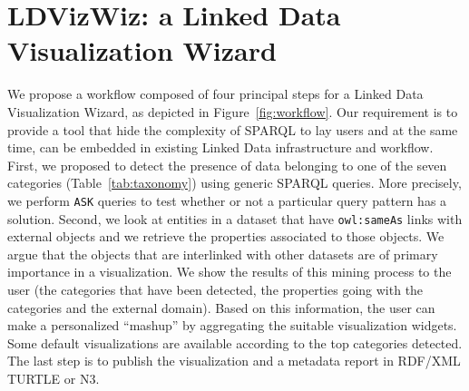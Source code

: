 \section{LDVizWiz: a Linked Data Visualization Wizard}
\label{sec:ldvizwiz}


We propose a workflow composed of four principal steps for a Linked Data Visualization Wizard, as depicted in Figure~\ref{fig:workflow}. Our requirement is to provide a tool that hide the complexity of SPARQL to lay users and at the same time, can be embedded in existing Linked Data infrastructure and workflow. First, we proposed to detect the presence of data belonging to one of the seven categories (Table~\ref{tab:taxonomy}) using generic SPARQL queries. More precisely, we perform \texttt{ASK} queries to test whether or not a particular query pattern has a solution. Second, we look at entities in a dataset that have \texttt{owl:sameAs} links with external objects and we retrieve the properties associated to those objects. We argue that the objects that are interlinked with other datasets are of primary importance in a visualization. We show the results of this mining process to the user (the categories that have been detected, the properties going with the categories and the external domain). Based on this information, the user can make a personalized ``mashup'' by aggregating the suitable visualization widgets. Some default visualizations are available according to the top categories detected. The last step is to publish the visualization and a metadata report in RDF/XML TURTLE or N3.

